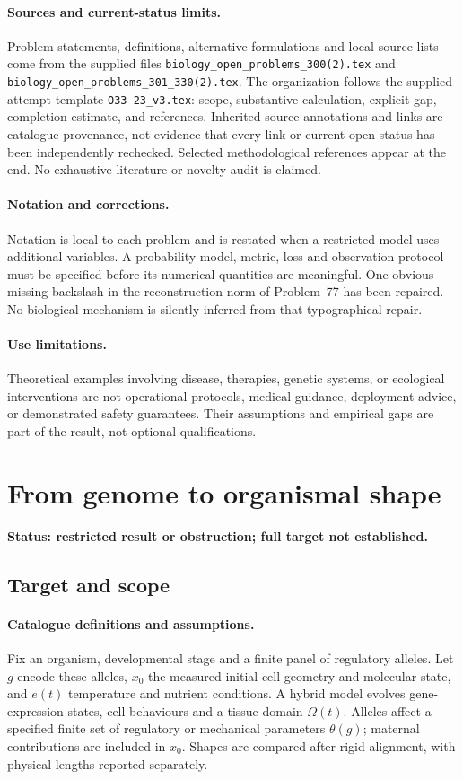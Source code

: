 \documentclass[11pt]{article}
\begin{document}
\paragraph{Sources and current-status limits.}
Problem statements, definitions, alternative formulations and local source lists
come from the supplied files
\texttt{biology\_open\_problems\_300(2).tex} and
\texttt{biology\_open\_problems\_301\_330(2).tex}.
The organization follows the supplied attempt template
\texttt{O33-23\_v3.tex}: scope, substantive calculation, explicit gap,
completion estimate, and references. Inherited source annotations and links are
catalogue provenance, not evidence that every link or current open status has
been independently rechecked. Selected methodological references appear at the
end. No exhaustive literature or novelty audit is claimed.

\paragraph{Notation and corrections.}
Notation is local to each problem and is restated when a restricted model uses
additional variables. A probability model, metric, loss and observation protocol
must be specified before its numerical quantities are meaningful. One obvious
missing backslash in the reconstruction norm of Problem~77 has been repaired.
No biological mechanism is silently inferred from that typographical repair.

\paragraph{Use limitations.}
Theoretical examples involving disease, therapies, genetic systems, or ecological
interventions are not operational protocols, medical guidance, deployment advice,
or demonstrated safety guarantees. Their assumptions and empirical gaps are part
of the result, not optional qualifications.


\section*{From genome to organismal shape}
\label{prob:121}
\noindent\textbf{Status: restricted result or obstruction; full target not established.}
\subsection{Target and scope}
\paragraph{Catalogue definitions and assumptions.}
Fix an organism, developmental stage and a finite panel of regulatory alleles. Let $g$ encode these alleles, $x_0$ the measured initial cell geometry and molecular state, and $e(t)$ temperature and nutrient conditions. A hybrid model evolves gene-expression states, cell behaviours and a tissue domain $\Omega(t)$. Alleles affect a specified finite set of regulatory or mechanical parameters $\theta(g)$; maternal contributions are included in $x_0$. Shapes are compared after rigid alignment, with physical lengths reported separately.
\end{document}
